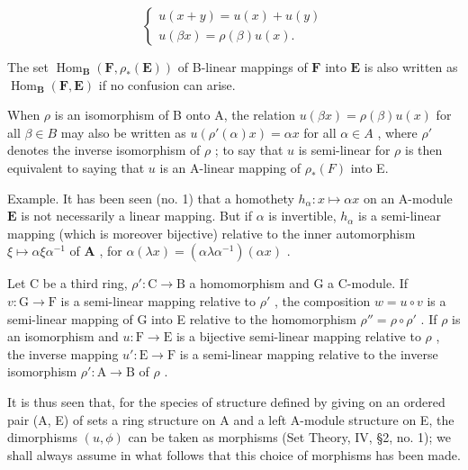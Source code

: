 \[
\left\{ \begin{array}{l} u (x + y) = u (x) + u (y) \\ u (\beta x) = \rho (\beta) u (x). \end{array} \right.\tag{48}
\]

The set \(\operatorname{Hom}_{\mathbf{B}}(\mathbf{F},\rho_{*}(\mathbf{E}))\) of B-linear mappings of \(\mathbf{F}\) into \(\mathbf{E}\) is also written as \(\operatorname{Hom}_{\mathbf{B}}(\mathbf{F},\mathbf{E})\) if no confusion can arise.

When \(\rho\) is an isomorphism of B onto A, the relation \(u(\beta x) = \rho(\beta) u(x)\) for all \(\beta \in B\) may also be written as \(u(\rho'(\alpha)x) = \alpha x\) for all \(\alpha \in A\) , where \(\rho'\) denotes the inverse isomorphism of \(\rho\) ; to say that \(u\) is semi-linear for \(\rho\) is then equivalent to saying that \(u\) is an A-linear mapping of \(\rho_*(F)\) into E.

Example. It has been seen (no. 1) that a homothety \(h_{\alpha} \colon x \mapsto \alpha x\) on an A-module \(\mathbf{E}\) is not necessarily a linear mapping. But if \(\alpha\) is invertible, \(h_{\alpha}\) is a semi-linear mapping (which is moreover bijective) relative to the inner automorphism \(\xi \mapsto \alpha \xi \alpha^{-1}\) of \(\mathbf{A}\) , for \(\alpha(\lambda x) = (\alpha \lambda \alpha^{-1})(\alpha x)\) .

Let C be a third ring, \(\rho':\mathrm{C}\to\mathrm{B}\) a homomorphism and G a C-module. If \(v:\mathrm{G}\to\mathrm{F}\) is a semi-linear mapping relative to \(\rho'\) , the composition \(w=u\circ v\) is a semi-linear mapping of G into E relative to the homomorphism \(\rho''=\rho\circ\rho'\) . If \(\rho\) is an isomorphism and \(u:\mathrm{F}\to\mathrm{E}\) is a bijective semi-linear mapping relative to \(\rho\) , the inverse mapping \(u':\mathrm{E}\to\mathrm{F}\) is a semi-linear mapping relative to the inverse isomorphism \(\rho':\mathrm{A}\to\mathrm{B}\) of \(\rho\) .

It is thus seen that, for the species of structure defined by giving on an ordered pair (A, E) of sets a ring structure on A and a left A-module structure on E, the dimorphisms \((u, \phi)\) can be taken as morphisms (Set Theory, IV, §2, no. 1); we shall always assume in what follows that this choice of morphisms has been made.

